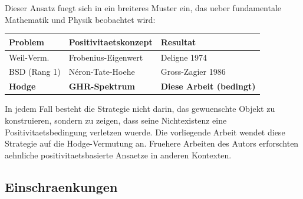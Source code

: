 \documentclass[aps,prd,twocolumn,superscriptaddress,nofootinbib]{revtex4-2}
\theoremstyle{definition}
\theoremstyle{remark}
\begin{document}
Dieser Ansatz fuegt sich in ein breiteres Muster ein, das ueber fundamentale Mathematik und Physik beobachtet wird:

\begin{center}
\begin{tabular}{lll}
\hline
Problem & Positivitaetskonzept & Resultat \\
\hline
Weil-Verm. & Frobenius-Eigenwert & Deligne 1974~\cite{Deligne1974} \\
BSD (Rang 1) & N\'eron-Tate-Hoehe & Gross-Zagier 1986~\cite{GrossZagier1986} \\
\textbf{Hodge} & \textbf{GHR-Spektrum} & \textbf{Diese Arbeit (bedingt)} \\
\hline
\end{tabular}
\end{center}

In jedem Fall besteht die Strategie nicht darin, das gewuenschte Objekt zu konstruieren, sondern zu zeigen, dass seine Nichtexistenz eine Positivitaetsbedingung verletzen wuerde. Die vorliegende Arbeit wendet diese Strategie auf die Hodge-Vermutung an. Fruehere Arbeiten des Autors \cite{GeigerRH2026c, FST-Unified2026} erforschten aehnliche positivitaetsbasierte Ansaetze in anderen Kontexten.

\subsection{Einschraenkungen}
\end{document}
